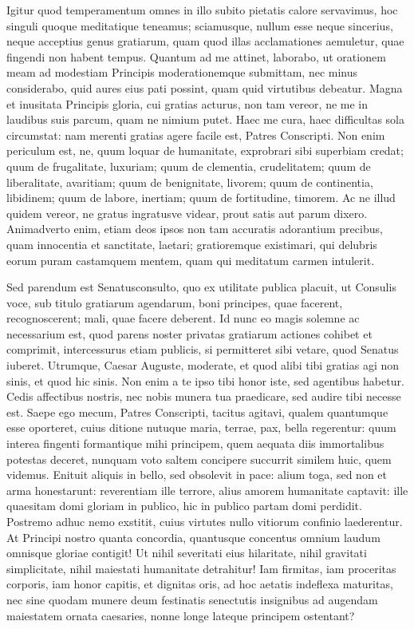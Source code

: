 Igitur quod temperamentum omnes in illo subito pietatis calore servavimus, hoc singuli quoque meditatique teneamus; sciamusque, nullum esse neque sincerius, neque acceptius genus gratiarum, quam quod illas acclamationes aemuletur, quae fingendi non habent tempus. Quantum ad me attinet, laborabo, ut orationem meam ad modestiam Principis moderationemque submittam, nec minus considerabo, quid aures eius pati possint, quam quid virtutibus debeatur. Magna et inusitata Principis gloria, cui gratias acturus, non tam vereor, ne me in laudibus suis parcum, quam ne nimium putet. Haec me cura, haec difficultas sola circumstat: nam merenti gratias agere facile est, Patres Conscripti. Non enim periculum est, ne, quum loquar de humanitate, exprobrari sibi superbiam credat; quum de frugalitate, luxuriam; quum de clementia, crudelitatem; quum de liberalitate, avaritiam; quum de benignitate, livorem; quum de continentia, libidinem; quum de labore, inertiam; quum de fortitudine, timorem. Ac ne illud quidem vereor, ne gratus ingratusve videar, prout satis aut parum dixero. Animadverto enim, etiam deos ipsos non tam accuratis adorantium precibus, quam innocentia et sanctitate, laetari; gratioremque existimari, qui delubris eorum puram castamquem mentem, quam qui meditatum carmen intulerit.

Sed parendum est Senatusconsulto, quo ex utilitate publica placuit, ut Consulis voce, sub titulo gratiarum agendarum, boni principes, quae facerent, recognoscerent; mali, quae facere deberent. Id nunc eo magis solemne ac necessarium est, quod parens noster privatas gratiarum actiones cohibet et comprimit, intercessurus etiam publicis, si permitteret sibi vetare, quod Senatus iuberet. Utrumque, Caesar Auguste, moderate, et quod alibi tibi gratias agi non sinis, et quod hic sinis. Non enim a te ipso tibi honor iste, sed agentibus habetur. Cedis affectibus nostris, nec nobis munera tua praedicare, sed audire tibi necesse est. Saepe ego mecum, Patres Conscripti, tacitus agitavi, qualem quantumque esse oporteret, cuius ditione nutuque maria, terrae, pax, bella regerentur: quum interea fingenti formantique mihi principem, quem aequata diis immortalibus potestas deceret, nunquam voto saltem concipere succurrit similem huic, quem videmus. Enituit aliquis in bello, sed obsolevit in pace: alium toga, sed non et arma honestarunt: reverentiam ille terrore, alius amorem humanitate captavit: ille quaesitam domi gloriam in publico, hic in publico partam domi perdidit. Postremo adhuc nemo exstitit, cuius virtutes nullo vitiorum confinio laederentur. At Principi nostro quanta concordia, quantusque concentus omnium laudum omnisque gloriae contigit! Ut nihil severitati eius hilaritate, nihil gravitati simplicitate, nihil maiestati humanitate detrahitur! Iam firmitas, iam proceritas corporis, iam honor capitis, et dignitas oris, ad hoc aetatis indeflexa maturitas, nec sine quodam munere deum festinatis senectutis insignibus ad augendam maiestatem ornata caesaries, nonne longe lateque principem ostentant?

